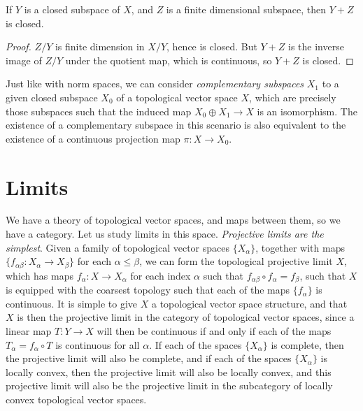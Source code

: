 \begin{corollary}
    If $Y$ is a closed subspace of $X$, and $Z$ is a finite dimensional subspace, then $Y + Z$ is closed.
\end{corollary}
\begin{proof}
    $Z/Y$ is finite dimension in $X/Y$, hence is closed. But $Y + Z$ is the inverse image of $Z/Y$ under the quotient map, which is continuous, so $Y + Z$ is closed.
\end{proof}

Just like with norm spaces, we can consider \emph{complementary subspaces} $X_1$ to a given closed subspace $X_0$ of a topological vector space $X$, which are precisely those subspaces such that the induced map $X_0 \oplus X_1 \to X$ is an isomorphism. The existence of a complementary subspace in this scenario is also equivalent to the existence of a continuous projection map $\pi: X \to X_0$.








\section{Limits}

We have a theory of topological vector spaces, and maps between them, so we have a category. Let us study  limits in this space. \emph{Projective limits are the simplest}. Given a family of topological vector spaces $\{ X_\alpha \}$, together with maps $\{ f_{\alpha \beta}: X_\alpha \to X_\beta \}$ for each $\alpha \leq \beta$, we can form the topological projective limit $X$, which has maps $f_\alpha: X \to X_\alpha$ for each index $\alpha$ such that $f_{\alpha \beta} \circ f_\alpha = f_\beta$, such that $X$ is equipped with the coarsest topology such that each of the maps $\{ f_\alpha \}$ is continuous. It is simple to give $X$ a topological vector space structure, and that $X$ is then the projective limit in the category of topological vector spaces, since a linear map $T: Y \to X$ will then be continuous if and only if each of the maps $T_\alpha = f_\alpha \circ T$ is continuous for all $\alpha$. If each of the spaces $\{ X_\alpha \}$ is complete, then the projective limit will also be complete, and if each of the spaces $\{ X_\alpha \}$ is locally convex, then the projective limit will also be locally convex, and this projective limit will also be the projective limit in the subcategory of locally convex topological vector spaces.

